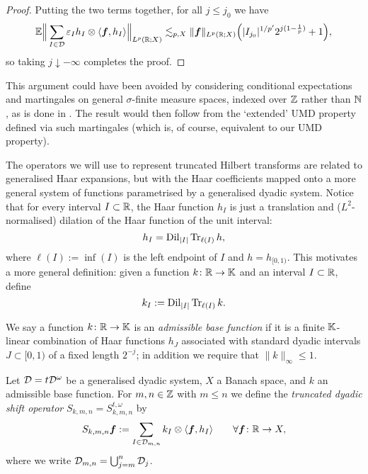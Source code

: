 \begin{proof}
  Putting the two terms together, for all $j \leq j_{0}$ we have
  \begin{equation*}
    \mathbb{E} \Big\| \sum_{I \in \mathcal{D}} \varepsilon_{I} h_{I} \otimes \langle \bm{f}, h_{I} \rangle \Big\|_{L^p(\mathbb{R};X)}
    \lesssim_{p,X}  \|\bm{f}\|_{L^p(\mathbb{R};X)} \Big(|I_{j_{0}}|^{1/p'}  2^{j(1 - \frac{1}{p})} + 1\Big),
  \end{equation*}
  so taking $j \downarrow -\infty$ completes the proof.
\end{proof}

\begin{rmk}
  This argument could have been avoided by considering conditional expectations and martingales on general $\sigma$-finite measure spaces, indexed over $\mathbb{Z}$ rather than $\mathbb{N}$, as is done in \cite{HNVW16}.
  The result would then follow from the `extended' UMD property defined via such martingales (which is, of course, equivalent to our UMD property).
\end{rmk}

The operators we will use to represent truncated Hilbert transforms are related to generalised Haar expansions, but with the Haar coefficients mapped onto a more general system of functions parametrised by a generalised dyadic system.
Notice that for every interval $I \subset \mathbb{R}$, the Haar function $h_{I}$ is just a translation and ($L^2$-normalised) dilation of the Haar function of the unit interval:
\begin{equation*}
  h_{I} = \operatorname{Dil}_{|I|} \operatorname{Tr}_{\ell(I)} h,
\end{equation*}
where $\ell(I) := \inf(I)$ is the left endpoint of $I$ and $h = h_{[0,1)}$.
This motivates a more general definition: given a function $k \colon \mathbb{R} \rightarrow \mathbb{K}$ and an interval $I \subset \mathbb{R}$, define
\begin{equation*}
  k_{I} := \operatorname{Dil}_{|I|} \operatorname{Tr}_{\ell(I)} k.
\end{equation*}

\begin{defn}
  We say a function $k \colon \mathbb{R} \rightarrow \mathbb{K}$ is an \emph{admissible base function} if it is a finite $\mathbb{K}$-linear combination of Haar functions $h_{J}$ associated with standard dyadic intervals $J \subset [0,1)$ of a fixed length $2^{-j}$; in addition we require that $\|k\|_{\infty} \leq 1$.
\end{defn}

\begin{defn}
  Let $\mathcal{D} = t\mathcal{D}^{\omega}$ be a generalised dyadic system, $X$ a Banach space, and $k$ an admissible base function.
  For $m,n \in \mathbb{Z}$ with $m \leq n$ we define the \emph{truncated dyadic shift operator} $S_{k,m,n} = S_{k,m,n}^{t,\omega}$ by
  \begin{equation*}
    S_{k,m,n} \bm{f} := \sum_{I \in \mathcal{D}_{m,n}} k_{I} \otimes \langle \bm{f}, h_{I} \rangle \qquad \forall \bm{f} \colon \mathbb{R} \rightarrow X,
  \end{equation*}
  where we write $\mathcal{D}_{m,n} = \bigcup_{j = m}^{n} \mathcal{D}_{j}$.
\end{defn}

